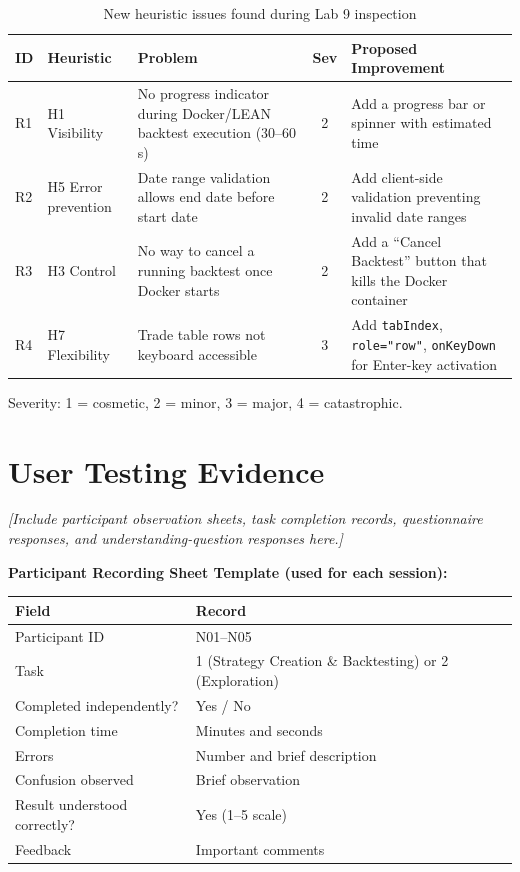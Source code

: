 \documentclass[10pt,a4paper]{article}
\begin{document}
\begin{table}[H]
\centering
\caption{New heuristic issues found during Lab 9 inspection}
\label{tab:new-issues}
\small
\begin{tabularx}{\textwidth}{l l L{4.2cm} c X}
\toprule
\textbf{ID} & \textbf{Heuristic} & \textbf{Problem} & \textbf{Sev} & \textbf{Proposed Improvement} \\
\midrule
R1 & H1 Visibility &
  No progress indicator during Docker/LEAN backtest execution (30--60\,s) &
  2 &
  Add a progress bar or spinner with estimated time \\[4pt]
R2 & H5 Error prevention &
  Date range validation allows end date before start date &
  2 &
  Add client-side validation preventing invalid date ranges \\[4pt]
R3 & H3 Control &
  No way to cancel a running backtest once Docker starts &
  2 &
  Add a ``Cancel Backtest'' button that kills the Docker container \\[4pt]
R4 & H7 Flexibility &
  Trade table rows not keyboard accessible &
  3 &
  Add \texttt{tabIndex}, \texttt{role="row"}, \texttt{onKeyDown} for Enter-key activation \\
\bottomrule
\end{tabularx}
\end{table}

Severity: 1 = cosmetic, 2 = minor, 3 = major, 4 = catastrophic.


\appendix
\section{User Testing Evidence}

\emph{[Include participant observation sheets, task completion records, questionnaire responses, and understanding-question responses here.]}

\textbf{Participant Recording Sheet Template (used for each session):}

\begin{table}[H]
\centering
\begin{tabularx}{\textwidth}{l X}
\toprule
\textbf{Field} & \textbf{Record} \\
\midrule
Participant ID & N01--N05 \\
Task & 1 (Strategy Creation \& Backtesting) or 2 (Exploration) \\
Completed independently? & Yes / No \\
Completion time & Minutes and seconds \\
Errors & Number and brief description \\
Confusion observed & Brief observation \\
Result understood correctly? & Yes (1--5 scale) \\
Feedback & Important comments \\
\bottomrule
\end{tabularx}
\end{table}
\end{document}
